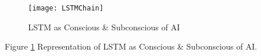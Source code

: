 \cite{article}
\begin{figure}[H]
	\texttt{[image: LSTMChain]}
	\caption{LSTM as Conscious \& Subconscious of AI}
	\label{Fig:fig31}
\end{figure}
Figure \ref{Fig:fig31} Representation of LSTM as Conscious \& Subconscious of AI.